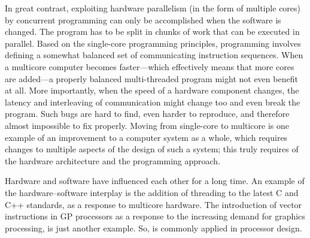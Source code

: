 In great contrast, exploiting hardware parallelism (in the form of multiple cores) by concurrent programming can only be accomplished when the software is changed.
The program has to be split in chunks of work that can be executed in parallel.
Based on the single-core programming principles, programming involves defining a somewhat balanced set of communicating instruction sequences.
When a multicore computer becomes faster---which effectively means that more cores are added---a properly balanced multi-threaded program might not even benefit at all.
More importantly, when the speed of a hardware component changes, the latency and interleaving of communication might change too and even break the program.
Such bugs are hard to find, even harder to reproduce, and therefore almost impossible to fix properly.
Moving from single-core to multicore is one example of an improvement to a computer system as a whole, which requires changes to multiple aspects of the design of such a system; this truly requires \emph{\codesign*} of the hardware architecture and the programming approach.

Hardware and software have influenced each other for a long time.
An example of the hardware--software interplay is the addition of threading to the latest C and C++ standards, as a response to multicore hardware.
The introduction of vector instructions in \acl{GP} processors as a response to the increasing demand for graphics processing, is just another example.
So, \codesign is commonly applied in processor design.

